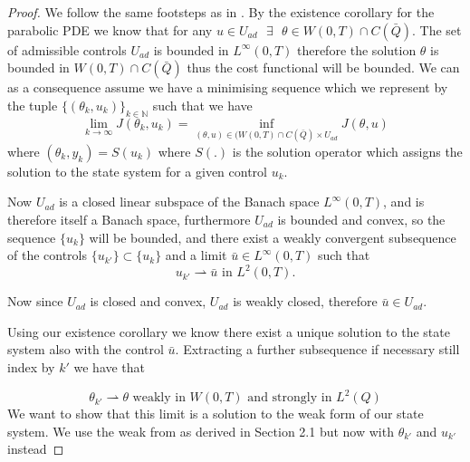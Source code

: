 \begin{proof}
We follow the same footsteps as in  \cite{DPSteel}. By the existence corollary for the parabolic PDE we know that  for any $u \in U_{ad} \text{ } \exists \text{ }\theta \in W(0,T)\cap C(\bar{Q})$. The set of admissible controls $U_{ad}$ is bounded in $L^{\infty}(0,T)$ therefore the solution $\theta$ is bounded in $W(0,T) \cap C(\bar{Q})$ thus the cost functional will be bounded. We can as a consequence assume we have a minimising sequence which we represent by the tuple $\{(\theta_k,u_k)\}_{k\in \mathbb{N}}$ such that we have 
\begin{equation*}
    \lim_{k\rightarrow \infty}J(\theta_k,u_k) = \inf_{(\theta,u)\in (W(0,T) \cap C(\bar{Q})\times U_{ad}}J(\theta,u)
\end{equation*}
where $(\theta_k,y_k) = S(u_k)$ where $S(.)$ is the solution operator which assigns the solution to the state system for a given control $u_k$.

Now $U_{ad}$ is a closed linear subspace of the Banach space $L^{\infty}(0,T)$, and is therefore itself a  Banach space, furthermore $U_{ad}$ is bounded and convex, so the sequence $\{u_k\}$ will be bounded, and there exist a weakly convergent subsequence of the controls $\{u_{k'} \} \subset \{u_k \}$ and a limit $\bar{u} \in L^{\infty}(0,T)$ such that
\begin{equation*}
    u_{k'} \rightharpoonup \bar{u} \text{ in } L^2(0,T).
\end{equation*}

Now since $U_{ad}$ is closed and convex, $U_{ad}$ is weakly closed, therefore $\bar{u} \in U_{ad}$. \bigskip

Using our existence corollary we know there exist a unique solution to the state system also with the control $\bar{u}$. Extracting a further subsequence if necessary still index by $k'$ we have that 

\begin{equation*}
    \theta_{k'} \rightharpoonup \theta \text{ weakly in } W(0,T) \text{ and strongly in } L^2(Q)
\end{equation*}
We want to show that this limit is a solution to the weak form of our state system. We use the weak from as derived in Section 2.1 but now with $\theta_{k'}$ and $u_{k'}$ instead 


\end{proof}
